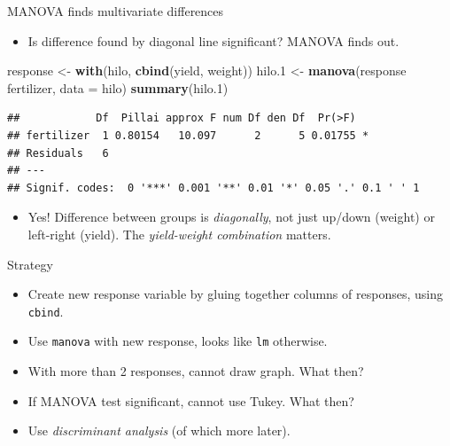 \documentclass[
  ignorenonframetext,
]{beamer}
\newenvironment{Shaded}{\begin{snugshade}}{\end{snugshade}}
\newcommand{\DataTypeTok}[1]{\textcolor[rgb]{0.13,0.29,0.53}{#1}}
\newcommand{\FloatTok}[1]{\textcolor[rgb]{0.00,0.00,0.81}{#1}}
\newcommand{\KeywordTok}[1]{\textcolor[rgb]{0.13,0.29,0.53}{\textbf{#1}}}
\newcommand{\NormalTok}[1]{#1}
\newcommand{\OperatorTok}[1]{\textcolor[rgb]{0.81,0.36,0.00}{\textbf{#1}}}
\newcommand{\StringTok}[1]{\textcolor[rgb]{0.31,0.60,0.02}{#1}}
\providecommand{\tightlist}{%
  \setlength{\itemsep}{0pt}\setlength{\parskip}{0pt}}
\begin{document}
\begin{frame}[fragile]{MANOVA finds multivariate differences}
\protect\hypertarget{manova-finds-multivariate-differences}{}

\begin{itemize}
\tightlist
\item
  Is difference found by diagonal line significant? MANOVA finds out.
\end{itemize}

\begin{Shaded}
\begin{Highlighting}[]
\NormalTok{response <-}\StringTok{ }\KeywordTok{with}\NormalTok{(hilo, }\KeywordTok{cbind}\NormalTok{(yield, weight))}
\NormalTok{hilo}\FloatTok{.1}\NormalTok{ <-}\StringTok{ }\KeywordTok{manova}\NormalTok{(response }\OperatorTok{~}\StringTok{ }\NormalTok{fertilizer, }\DataTypeTok{data =}\NormalTok{ hilo)}
\KeywordTok{summary}\NormalTok{(hilo}\FloatTok{.1}\NormalTok{)}
\end{Highlighting}
\end{Shaded}

\begin{verbatim}
##            Df  Pillai approx F num Df den Df  Pr(>F)  
## fertilizer  1 0.80154   10.097      2      5 0.01755 *
## Residuals   6                                         
## ---
## Signif. codes:  0 '***' 0.001 '**' 0.01 '*' 0.05 '.' 0.1 ' ' 1
\end{verbatim}

\begin{itemize}
\tightlist
\item
  Yes! Difference between groups is \emph{diagonally}, not just up/down
  (weight) or left-right (yield). The \emph{yield-weight combination}
  matters.
\end{itemize}

\end{frame}

\begin{frame}[fragile]{Strategy}
\protect\hypertarget{strategy}{}

\begin{itemize}
\item
  Create new response variable by gluing together columns of responses,
  using \texttt{cbind}.
\item
  Use \texttt{manova} with new response, looks like \texttt{lm}
  otherwise.
\item
  With more than 2 responses, cannot draw graph. What then?
\item
  If MANOVA test significant, cannot use Tukey. What then?
\item
  Use \emph{discriminant analysis} (of which more later).
\end{itemize}

\end{frame}
\end{document}
